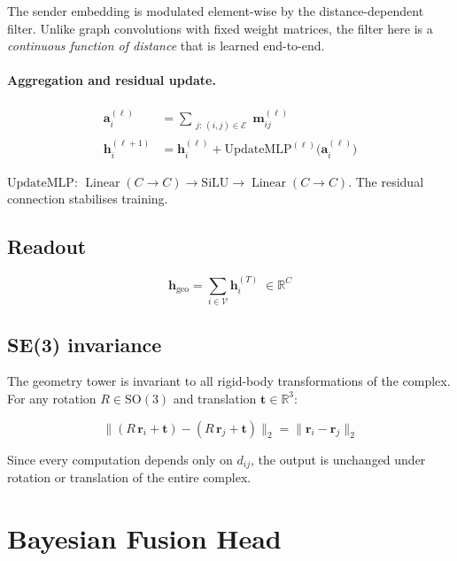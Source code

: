 \documentclass[11pt,a4paper]{article}
\newcommand{\R}{\mathbb{R}}
\newcommand{\bh}{\mathbf{h}}
\newcommand{\br}{\mathbf{r}}
\newcommand{\SiLU}{\mathrm{SiLU}}
\begin{document}
The sender embedding is modulated element-wise by the distance-dependent filter.
Unlike graph convolutions with fixed weight matrices, the filter here is a
\emph{continuous function of distance} that is learned end-to-end.

\paragraph{Aggregation and residual update.}
\begin{align}
\mathbf{a}_i^{(\ell)}
  &= \sum_{\substack{j:\,(i,j)\in\mathcal{E}}} \mathbf{m}_{ij}^{(\ell)}
\label{eq:agg}\\[4pt]
\bh_i^{(\ell+1)}
  &= \bh_i^{(\ell)} + \mathrm{UpdateMLP}^{(\ell)}\!\bigl(\mathbf{a}_i^{(\ell)}\bigr)
\label{eq:residual}
\end{align}

$\mathrm{UpdateMLP}$: $\operatorname{Linear}(C\to C) \to \SiLU \to
\operatorname{Linear}(C\to C)$.  The residual connection stabilises training.

\subsection{Readout}

\begin{equation}
\bh_{\mathrm{geo}} = \sum_{i \in \mathcal{V}} \bh_i^{(T)} \;\in \R^C
\end{equation}

\subsection{SE(3) invariance}

The geometry tower is invariant to all rigid-body transformations of the complex.
For any rotation $R \in \mathrm{SO}(3)$ and translation $\mathbf{t} \in \R^3$:

\begin{equation}
\bigl\|(R\,\br_i + \mathbf{t}) - (R\,\br_j + \mathbf{t})\bigr\|_2
= \|\br_i - \br_j\|_2
\end{equation}

Since every computation depends only on $d_{ij}$, the output is unchanged under
rotation or translation of the entire complex.

\section{Bayesian Fusion Head}
\label{sec:bayes}
\end{document}
